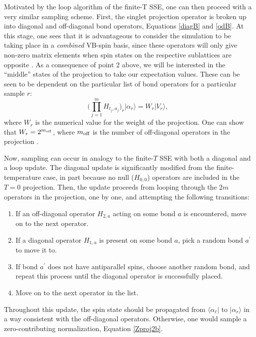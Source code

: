 \documentclass[vecphys]{svmult}
\begin{document}
Motivated by the loop algorithm of the finite-T SSE, one can then proceed with a very similar sampling scheme.  First, the singlet projection operator is broken up into diagonal and off-diagonal bond operators, Equations \ref{diagB} and \ref{odB}.
At this stage, one sees that it is advantageous to consider the simulation to be taking place in a {\em combined} VB-spin basis, since these operators will only give non-zero matrix elements when spin states on the respective sublattices are opposite \cite{Melko:Sandvik10a}.  
As a consequence of point 2 above, we will be interested in the ``middle'' states of the projection to take our expectation values.  These can be seen to be dependent on the particular list of bond operators for a particular sample $r$: 
\begin{equation}
\big( \prod_{j=1}^{m} {H_{t_j,a_j}} \big)_r | \alpha_r \rangle = W_r |V_r \rangle, \label{midV}
\end{equation}
 where $W_r$ is the numerical value for the weight of the projection.  One can show that $W_r = 2^{m_{\rm off}}$, where $m_{\rm off}$ is the number of off-diagonal operators in the projection \cite{Melko:Sandvik05,Melko:AWSBeach}.

Now, sampling can occur in analogy to the finite-$T$ SSE with both a diagonal and a loop update.
The diagonal update is significantly modified from the finite-temperature case, in part because no null ($H_{0,0}$) operators are included in the $T=0$ projection.  Then, the update proceeds from looping through the $2m$ operators in the projection, one by one, and attempting the following transitions:
\begin{enumerate}
\item If an off-diagonal operator $H_{2,a}$ acting on some bond $a$ is encountered, move on to the next operator.
\item If a diagonal operator $H_{1,a}$ is present on some bond $a$, pick a random bond $a^\prime$ to move it to.
\item If bond $a^\prime$ does not have antiparallel spins, choose another random bond, and repeat this process until the diagonal operator is successfully placed.
\item Move on to the next operator in the list.
\end{enumerate}
Throughout this update, the spin state should be propagated from $\langle \alpha_{\ell} |$ to $| \alpha_r \rangle$ in a way consistent with the off-diagonal operators.  Otherwise, one would sample a zero-contributing normalization, Equation \ref{Zproj2b}.
\end{document}

